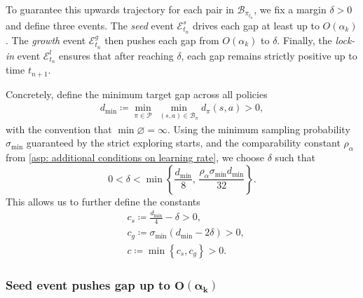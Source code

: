 

To guarantee this upwards trajectory for each pair in $\mathcal B_{\pi_{t_n}}$, we fix a margin $\delta>0$ and define three events.
The \textit{seed} event $\mathcal E^s_{t_n}$ drives each gap at least up to $O(\alpha_k)$.
The \textit{growth} event $\mathcal E^g_{t_n}$ then pushes each gap from $O(\alpha_k)$ to $\delta$.
Finally, the \textit{lock-in} event $\mathcal E^l_{t_n}$ ensures that after reaching $\delta$, each gap remains strictly positive up to time $t_{n+1}$.

Concretely, define the minimum target gap across all policies
\begin{align}
\label{eq: min target gap}  
d_{\min}
\coloneqq
\min_{\pi\in\mathcal P}\ \min_{(s,a)\in \mathcal B_\pi} d_\pi(s,a) > 0 ,
\end{align}
with the convention that $\min\varnothing=\infty$.
Using the minimum sampling probability $\sigma_{\min}$ guaranteed by the strict exploring starts,
and the comparability constant $\rho_\alpha$ from \autoref{asp: additional conditions on learning rate},
we choose $\delta$ such that
\begin{equation}
\label{eq:delta-choice}
0<\delta<\min\left\{\frac{d_{\min}}{8},\,\frac{\rho_\alpha \sigma_{\min} d_{\min}}{32}\right\}.
\end{equation}
This allows us to further define the constants
\begin{align}  
\label{eq:cs-def}
&c_s \coloneqq \frac{d_{\min}}{4} - \delta > 0,
\\
\label{eq:cg-def}
&c_g \coloneqq \sigma_{\min} ( d_{\min} - 2 \delta) > 0,
\\
\label{eq:c-def}
&c \coloneqq \min \left\{ c_s, c_g \right\} > 0.
\end{align}



\subsubsection{Seed event pushes gap up to $\bm{O(\alpha_k)}$}

